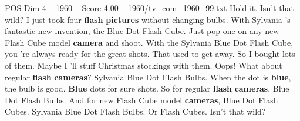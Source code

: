 \begin{textsample}{POS Dim 4 – 1960 – Score 4.00 – 1960/tv\_com\_1960\_99.txt}  \label{ex:f4_pos_003}
Hold it.
Isn't that wild?
I just took four \textbf{flash} \textbf{pictures} without changing bulbs.
With Sylvania 's fantastic new invention, the Blue Dot Flash Cube.
Just pop one on any new Flash Cube model \textbf{camera} and shoot.
With the Sylvania Blue Dot Flash Cube, you 're always ready for the great shots.
That used to get away.
So I bought lots of them.
Maybe I 'll stuff Christmas stockings with them.
Oops!
What about regular \textbf{flash} \textbf{cameras}?
Sylvania Blue Dot Flash Bulbs.
When the dot is \textbf{blue}, the bulb is good. \textbf{Blue} dots for sure shots.
So for regular \textbf{flash} \textbf{cameras}, Blue Dot Flash Bulbs.
And for new Flash Cube model \textbf{cameras}, Blue Dot Flash Cubes.
Sylvania Blue Dot Flash Bulbs.
Or Flash Cubes.
Isn't that wild?

\end{textsample}
